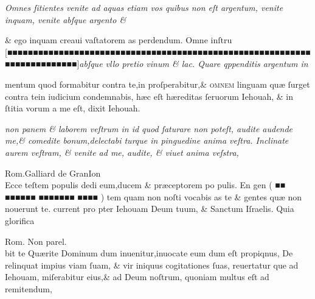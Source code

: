 \documentclass[letterpaper]{article}
\begin{document}
{\begin{multicols}{2}
	\columnbreak
	\justifying
	\noindent
	\textit{Omnes ſitientes venite ad aquas etiam vos quibus non eſt argentum, venite inquam, venite abſque argento \&\\}
\end{multicols}
\fontsize{6.25}{7}\selectfont
\vspace{-2.7\baselineskip}
\noindent \& ego inquam creaui vaſtatorem as perdendum. Omne inſtru \hfill[\hfill ■■■■■■■■■■■■■■■■■■■■■■■■■■■■■■■■■■■■■■■■■■■■■■■■■■■■■■■■■■■■■■■■■■■■■■■■■\hfill]\hfill \textit{abſque vllo pretio vinum \& lac. Quare qppenditis argentum in}
\vspace{-1.6\baselineskip}
\begin{multicols}{2}
	\fontsize{6.25}{7}\selectfont
	\justifying
	\noindent mentum quod formabitur contra te,in proſperabitur,\& \textsc{ omnem} linguam qu\ae{} ſurget contra tein iudicium\linebreak
	condemnabis, h\ae{}c eſt h\ae{}reditas ſeruorum Iehouah, \& in ſtitia vorum a me eſt, dixit Iehouah.

	\columnbreak
	\justifying
	\noindent
	\textit{non panem \& laborem veſtrum in id quod ſaturare non poteſt, audite audende me,\& comedite bonum,delectabi\linebreak
		turque in pinguedine anima veſtra. Inclinate aurem veſtram, \& venite ad me, audite, \& viuet anima veſstra,
	}
\end{multicols}
\setlength{\columnsep}{3mm}
\begin{multicols}{4}
	\tiny
	\centering
	Rom.Galliard de GranIon\\
	\fontsize{4}{5}\selectfont
	\justifying
	\noindent \quad Ecce teſtem populis dedi eum,ducem \& pr\ae{}ceptorem po\linebreak
	pulis. En gen ( ■■ ■■■■■■ ■■■■■■■ ■■■■ ) tem quam non\linebreak
	noſti vocabis as te \& gentes qu\ae{} non nouerunt te. current pro\linebreak
	pter Iehouam Deum tuum, \& Sanctum Iſraelis. Quia glorifica

	\columnbreak

	\centering
	Rom. Non parel.\\
	\fontsize{3}{3.75}\selectfont
	\justifying
	\noindent bit te Qu\ae{}rite Dominum dum inuenitur,inuocate eum dum eſt propiqnus,\linebreak
	De relinquat impius viam ſuam, \& vir iniquus cogitationes ſuas, reuertatur\linebreak
	que ad Iehouam, miſerabitur eius,\& ad Deum noſtrum, quoniam multus eſt\linebreak
	ad remitendum,


\end{multicols}}
\end{document}
